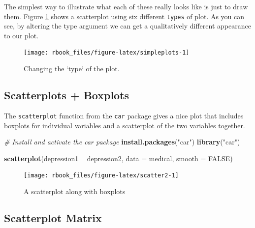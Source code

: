 \documentclass[]{book}
\newenvironment{Shaded}{\begin{snugshade}}{\end{snugshade}}
\newcommand{\CommentTok}[1]{\textcolor[rgb]{0.56,0.35,0.01}{\textit{#1}}}
\newcommand{\DataTypeTok}[1]{\textcolor[rgb]{0.13,0.29,0.53}{#1}}
\newcommand{\KeywordTok}[1]{\textcolor[rgb]{0.13,0.29,0.53}{\textbf{#1}}}
\newcommand{\NormalTok}[1]{#1}
\newcommand{\OperatorTok}[1]{\textcolor[rgb]{0.81,0.36,0.00}{\textbf{#1}}}
\newcommand{\OtherTok}[1]{\textcolor[rgb]{0.56,0.35,0.01}{#1}}
\newcommand{\StringTok}[1]{\textcolor[rgb]{0.31,0.60,0.02}{#1}}
\begin{document}
The simplest way to illustrate what each of these really looks like is just to draw them. Figure \ref{fig:simpleplots} shows a scatterplot using six different \texttt{types} of plot. As you can see, by altering the type argument we can get a qualitatively different appearance to our plot.

\begin{figure}

{\centering \texttt{[image: rbook\_files/figure-latex/simpleplots-1]} 

}

\caption{Changing the `type` of the plot.}\label{fig:simpleplots}
\end{figure}

\hypertarget{scatterplots-boxplots}{%
\subsection{Scatterplots + Boxplots}\label{scatterplots-boxplots}}

The \texttt{scatterplot} function from the \texttt{car} package \citep{R-car} gives a nice plot that includes boxplots for individual variables and a scatterplot of the two variables together.

\begin{Shaded}
\begin{Highlighting}[]
\CommentTok{# Install and activate the car package}
\KeywordTok{install.packages}\NormalTok{(}\StringTok{"car"}\NormalTok{)}
\KeywordTok{library}\NormalTok{(}\StringTok{"car"}\NormalTok{)}

\KeywordTok{scatterplot}\NormalTok{(depression1 }\OperatorTok{~}\StringTok{ }\NormalTok{depression2, }
            \DataTypeTok{data =}\NormalTok{ medical, }
            \DataTypeTok{smooth =} \OtherTok{FALSE}\NormalTok{)}
\end{Highlighting}
\end{Shaded}

\begin{figure}

{\centering \texttt{[image: rbook\_files/figure-latex/scatter2-1]} 

}

\caption{A scatterplot along with boxplots}\label{fig:scatter2}
\end{figure}

\hypertarget{scatterplot-matrix}{%
\subsection{Scatterplot Matrix}\label{scatterplot-matrix}}
\end{document}
